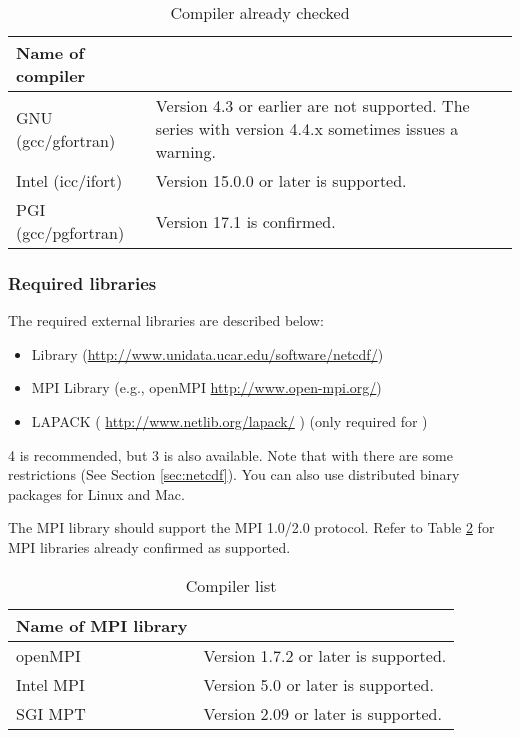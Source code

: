 \begin{table}[tb]
\begin{center}
\caption{Compiler already checked}
\begin{tabularx}{150mm}{|l|X|} \hline
 \rowcolor[gray]{0.9} Name of compiler &  \\ \hline
  GNU (gcc/gfortran)    & Version 4.3 or earlier are not supported. The series with version 4.4.x sometimes issues a warning. \\ \hline
  Intel (icc/ifort)     & Version 15.0.0 or later is supported. \\ \hline
  PGI (gcc/pgfortran)   & Version 17.1 is confirmed.       \\ \hline
\end{tabularx}
\label{tab:compatible_compiler}
\end{center}
\end{table}



\subsubsection{Required libraries}\label{sec:inst_env}

The required external libraries are described below:
\begin{itemize}
\item {\netcdf} Library (\url{http://www.unidata.ucar.edu/software/netcdf/})
\item MPI Library (e.g., openMPI \url{http://www.open-mpi.org/})
\item LAPACK ( \url{http://www.netlib.org/lapack/} ) (only required for \scalegm)
\end{itemize}

{\netcdf}4 is recommended, but {\netcdf}3 is also available.
Note that with  there are some restrictions (See Section \ref{sec:netcdf}).
You can also use distributed binary packages for Linux and Mac.

The MPI library should support the MPI 1.0/2.0 protocol.  Refer to Table \ref{tab:compatible_mpi} for MPI libraries already confirmed as supported.

\begin{table}[tb]
\begin{center}
\caption{Compiler list}
\begin{tabularx}{150mm}{|l|X|} \hline
 \rowcolor[gray]{0.9} Name of MPI library &  \\ \hline
  openMPI               & Version 1.7.2 or later is supported. \\ \hline
  Intel MPI             & Version 5.0 or later is supported.\\ \hline
  SGI MPT               & Version 2.09 or later is supported. \\ \hline
\end{tabularx}
\label{tab:compatible_mpi}
\end{center}
\end{table}


